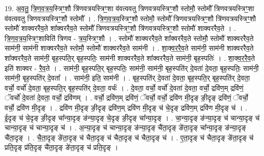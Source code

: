\documentclass[17pt]{extarticle}
\begin{document}
19. अ॒व॒तु॒ त्रि॒ण॒व॒त्र॒य॒स्त्रिꣳ॒॒शौ त्रि॑णवत्रयस्त्रिꣳ॒॒शा व॑वत्ववतु त्रिणवत्रयस्त्रिꣳ॒॒शौ स्तोमौ॒ स्तोमौ᳚ त्रिणवत्रयस्त्रिꣳ॒॒शा व॑वत्ववतु त्रिणवत्रयस्त्रिꣳ॒॒शौ स्तोमौ᳚ । . त्रि॒ण॒व॒त्र॒य॒स्त्रिꣳ॒॒शौ स्तोमौ॒ स्तोमौ᳚ त्रिणवत्रयस्त्रिꣳ॒॒शौ त्रि॑णवत्रयस्त्रिꣳ॒॒शौ स्तोमौ॑ शाक्वररैव॒ते शा᳚क्वररैव॒ते स्तोमौ᳚ त्रिणवत्रयस्त्रिꣳ॒॒शौ त्रि॑णवत्रयस्त्रिꣳ॒॒शौ स्तोमौ॑ शाक्वररैव॒ते । . त्रि॒ण॒व॒त्र॒य॒स्त्रिꣳ॒॒शाविति॑ त्रिणव - त्र॒य॒स्त्रिꣳ॒॒शौ । . स्तोमौ॑ शाक्वररैव॒ते शा᳚क्वररैव॒ते स्तोमौ॒ स्तोमौ॑ शाक्वररैव॒ते साम॑नी॒ साम॑नी शाक्वररैव॒ते स्तोमौ॒ स्तोमौ॑ शाक्वररैव॒ते साम॑नी । . शा॒क्व॒र॒रै॒व॒ते साम॑नी॒ साम॑नी शाक्वररैव॒ते शा᳚क्वररैव॒ते साम॑नी॒ बृह॒स्पति॒र् बृह॒स्पतिः॒ साम॑नी शाक्वररैव॒ते शा᳚क्वररैव॒ते साम॑नी॒ बृह॒स्पतिः॑ । . शा॒क्व॒र॒रै॒व॒ते इति॑ शाक्वर - रै॒व॒ते । . साम॑नी॒ बृह॒स्पति॒र् बृह॒स्पतिः॒ साम॑नी॒ साम॑नी॒ बृह॒स्पति॑र् दे॒वता॑ दे॒वता॒ बृह॒स्पतिः॒ साम॑नी॒ साम॑नी॒ बृह॒स्पति॑र् दे॒वता᳚ । . साम॑नी॒ इति॒ साम॑नी । . बृह॒स्पति॑र् दे॒वता॑ दे॒वता॒ बृह॒स्पति॒र् बृह॒स्पति॑र् दे॒वता॒ वर्चो॒ वर्चो॑ दे॒वता॒ बृह॒स्पति॒र् बृह॒स्पति॑र् दे॒वता॒ वर्चः॑ । . दे॒वता॒ वर्चो॒ वर्चो॑ दे॒वता॑ दे॒वता॒ वर्चो॒ द्रवि॑ण॒म् द्रवि॑णं॒ ॅवर्चो॑ दे॒वता॑ दे॒वता॒ वर्चो॒ द्रवि॑णम् । . वर्चो॒ द्रवि॑ण॒म् द्रवि॑णं॒ ॅवर्चो॒ वर्चो॒ द्रवि॑ण मी॒दृङ् ङी॒दृङ् द्रवि॑णं॒ ॅवर्चो॒ वर्चो॒ द्रवि॑ण मी॒दृङ् । . द्रवि॑ण मी॒दृङ् ङी॒दृङ् द्रवि॑ण॒म् द्रवि॑ण मी॒दृङ् च॑ चे॒दृङ् द्रवि॑ण॒म् द्रवि॑ण मी॒दृङ् च॑ । . ई॒दृङ् च॑ चे॒दृङ् ङी॒दृङ् चा᳚न्या॒दृङ् ङ॑न्या॒दृङ् चे॒दृङ् ङी॒दृङ् चा᳚न्या॒दृङ् । . चा॒न्या॒दृङ् ङ॑न्या॒दृङ् च॑ चान्या॒दृङ् च॑ चान्या॒दृङ् च॑ चान्या॒दृङ् च॑ । . अ॒न्या॒दृङ् च॑ चान्या॒दृङ् ङ॑न्या॒दृङ् चै॑ता॒दृङ् ङे॑ता॒दृङ् चा᳚न्या॒दृङ् ङ॑न्या॒दृङ् चै॑ता॒दृङ् । . चै॒ता॒दृङ् ङे॑ता॒दृङ् च॑ चैता॒दृङ् च॑ चैता॒दृङ् च॑ चैता॒दृङ् च॑ । . ए॒ता॒दृङ् च॑ चैता॒दृङ् ङे॑ता॒दृङ् च॑ प्रति॒दृङ् प्र॑ति॒दृङ् चै॑ता॒दृङ् ङे॑ता॒दृङ् च॑ प्रति॒दृङ् । \newline
\end{document}
